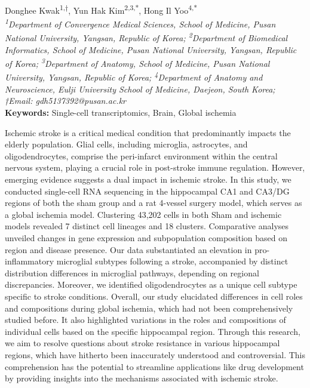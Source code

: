 \begin{center}
Donghee Kwak\textsuperscript{1,†}, Yun Hak Kim\textsuperscript{2,3,*}, Hong Il Yoo\textsuperscript{4,*} \\
\vspace{0.2cm}
\textit{\textsuperscript{1}Department of Convergence Medical Sciences, School of Medicine, Pusan National University, Yangsan, Republic of Korea; \textsuperscript{2}Department of Biomedical Informatics, School of Medicine, Pusan National University, Yangsan, Republic of Korea; \textsuperscript{3}Department of Anatomy, School of Medicine, Pusan National University, Yangsan, Republic of Korea; \textsuperscript{4}Department of Anatomy and Neuroscience, Eulji University School of Medicine, Daejeon, South Korea; †Email: gdh5137392@pusan.ac.kr} \\
\vspace{0.2cm}
\textbf{Keywords:} Single-cell transcriptomics, Brain, Global ischemia

\end{center}

\noindent
Ischemic stroke is a critical medical condition that predominantly impacts the elderly population. Glial cells, including microglia, astrocytes, and oligodendrocytes, comprise the peri-infarct environment within the central nervous system, playing a crucial role in post-stroke immune regulation. However, emerging evidence suggests a dual impact in ischemic stroke. In this study, we conducted single-cell RNA sequencing in the hippocampal CA1 and CA3/DG regions of both the sham group and a rat 4-vessel surgery model, which serves as a global ischemia model. Clustering 43,202 cells in both Sham and ischemic models revealed 7 distinct cell lineages and 18 clusters. Comparative analyses unveiled changes in gene expression and subpopulation composition based on region and disease presence. Our data substantiated an elevation in pro-inflammatory microglial subtypes following a stroke, accompanied by distinct distribution differences in microglial pathways, depending on regional discrepancies. Moreover, we identified oligodendrocytes as a unique cell subtype specific to stroke conditions. Overall, our study elucidated differences in cell roles and compositions during global ischemia, which had not been comprehensively studied before. It also highlighted variations in the roles and compositions of individual cells based on the specific hippocampal region. Through this research, we aim to resolve questions about stroke resistance in various hippocampal regions, which have hitherto been inaccurately understood and controversial. This comprehension has the potential to streamline applications like drug development by providing insights into the mechanisms associated with ischemic stroke.
\newpage


